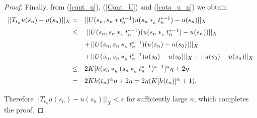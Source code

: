\documentclass[10pt,a4paper]{amsart}
\begin{document}
\begin{proof}
Finally, from (\ref{cont_u}), (\ref{Cont_U}) and (\ref{cota_u_n}) we obtain
$$
\begin{array}{rl}
\medskip
    ||T_{t_n}u(s_n) - u(s_n)||_X = & ||U(s_n, s_n*t_n^{*-1}) u(s_n*_{_h} t_n^{*-1}) - u(s_n)||_X \\
    \medskip
    \le & \  ||U(s_n, s_n*_{_h}t_n^{*-1}) (u(s_n*_{_h}t_n^{*-1}) - u(s_n))||_X \\
    \medskip
     &  + \, ||U(s_n, s_n*_{_h} t_n^{*-1})( u(s_n) - u(s_0))||_X  \\  
\medskip
     &  + \, ||U(s_n, s_n*_{_h}t_n^{*-1}) u(s_0) - u(s_0)||_X   +  || u(s_0) - u(s_n)||_X  \\  
\medskip
\le & 2K [h(s_n*_{_h}(s_n*_{_h}t_n^{*-1})^{*-1}]^\alpha \eta + 2 \eta \\
\medskip
= & 2 K h(t_n)^\alpha \eta + 2 \eta = 2 \eta ( K [h(t_n)]^\alpha +   1) .  \end{array}
$$
Therefore $||T_{t_n}u(s_n) - u(s_n)||_X < \varepsilon$ for sufficiently large $n$, which completes the proof.
\end{proof}
\end{document}
